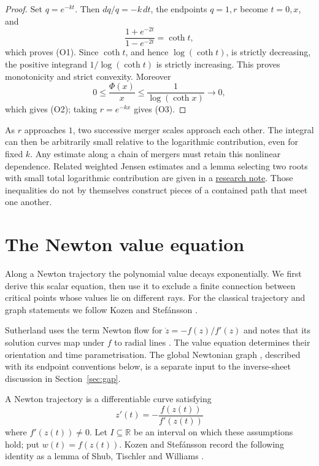 \documentclass[11pt]{article}
\begin{document}
\begin{proof}
Set $q=e^{-kt}$.  Then $dq/q=-k\,dt$, the endpoints $q=1,r$ become
$t=0,x$, and
\[
 \frac{1+e^{-2t}}{1-e^{-2t}}=\coth t,
\]
which proves (O1).  Since $\coth t$, and hence $\log(\coth t)$, is strictly
decreasing, the positive integrand $1/\log(\coth t)$ is strictly increasing.
This proves monotonicity and strict convexity.  Moreover
\[
 0\le\frac{\Phi(x)}x\le\frac1{\log(\coth x)}\longrightarrow0,
\]
which gives (O2); taking $r=e^{-kx}$ gives (O3).
\end{proof}


As $r$ approaches $1$, two successive merger scales approach each other.
The integral can then be arbitrarily small relative to the logarithmic
contribution, even for
fixed $k$. Any estimate along a chain of mergers must retain this nonlinear
dependence. Related weighted Jensen estimates and a lemma selecting two
roots with small total logarithmic contribution are given in a
\href{https://github.com/wcook04/plectis-erdos/blob/f36a98bf3d3e6f65f1074e3b800e3293d5b8a51a/ErdosProblems/Erdos1041/AttachmentAgeLifetimeOrlicz.md}{research note}.
Those inequalities do not by themselves construct pieces of a contained
path that meet one another.


\section{The Newton value equation}\label{sec:newton}

Along a Newton trajectory the polynomial value decays exponentially.
We first derive this scalar equation, then use it to exclude a finite
connection between critical points whose values lie on different rays.
For the classical trajectory and graph statements we follow Kozen and
Stef\'ansson \cite[Lemmas~2.1--2.2 and \S2]{kozen-stefansson1997}.


Sutherland uses the term Newton flow for $\dot z=-f(z)/f'(z)$ and
notes that its solution curves map under $f$ to radial lines
\cite[p.~42]{sutherland1992}. The value equation
\cite[Lemma~2.1]{kozen-stefansson1997} determines their orientation and
time parametrisation. The global Newtonian graph
\cite[\S2]{kozen-stefansson1997}, described with its endpoint conventions
below, is a separate input to the inverse-sheet discussion in
Section~\ref{sec:gap}.

A Newton trajectory is a differentiable curve satisfying
\[
 z'(t)=-\frac{f(z(t))}{f'(z(t))}
\]
where $f'(z(t))\ne0$. Let $I\subseteq\mathbb R$ be an interval on
which these assumptions hold;
put $w(t)=f(z(t))$.  Kozen and Stef\'ansson record the following identity as
a lemma of Shub, Tischler and Williams \cite[Lemma~2.1]{kozen-stefansson1997}.
\end{document}
